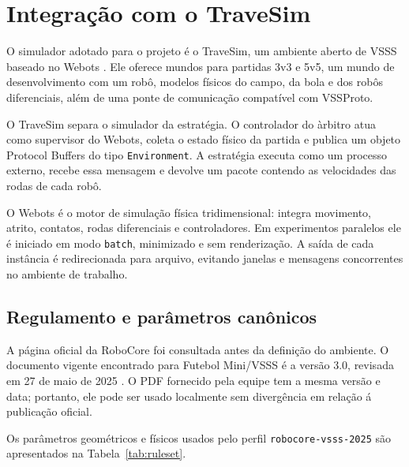 \documentclass[12pt,a4paper]{article}
\begin{document}
\section{Integra\c{c}\~ao com o TraveSim}
\label{sec:travesim}

O simulador adotado para o projeto \'e o TraveSim, um ambiente aberto de VSSS baseado no Webots \cite{travesim}. Ele oferece mundos para partidas 3v3 e 5v5, um mundo de desenvolvimento com um rob\^o, modelos f\'isicos do campo, da bola e dos rob\^os diferenciais, al\'em de uma ponte de comunica\c{c}\~ao compat\'ivel com VSSProto.

O TraveSim separa o simulador da estrat\'egia. O controlador do \`arbitro atua como supervisor do Webots, coleta o estado f\'isico da partida e publica um objeto Protocol Buffers do tipo \texttt{Environment}. A estrat\'egia executa como um processo externo, recebe essa mensagem e devolve um pacote contendo as velocidades das rodas de cada rob\^o.

O Webots \'e o motor de simula\c{c}\~ao f\'isica tridimensional: integra movimento, atrito, contatos, rodas diferenciais e controladores. Em experimentos paralelos ele \'e iniciado em modo \texttt{batch}, minimizado e sem renderiza\c{c}\~ao. A sa\'ida de cada inst\^ancia \'e redirecionada para arquivo, evitando janelas e mensagens concorrentes no ambiente de trabalho.

\subsection{Regulamento e par\^ametros can\^onicos}

A p\'agina oficial da RoboCore foi consultada antes da defini\c{c}\~ao do ambiente. O documento vigente encontrado para Futebol Mini/VSSS \'e a vers\~ao 3.0, revisada em 27 de maio de 2025 \cite{robocoreRules}. O PDF fornecido pela equipe tem a mesma vers\~ao e data; portanto, ele pode ser usado localmente sem diverg\^encia em rela\c{c}\~ao \'a publica\c{c}\~ao oficial.

Os par\^ametros geom\'etricos e f\'isicos usados pelo perfil \texttt{robocore-vsss-2025} s\~ao apresentados na Tabela~\ref{tab:ruleset}.
\end{document}
